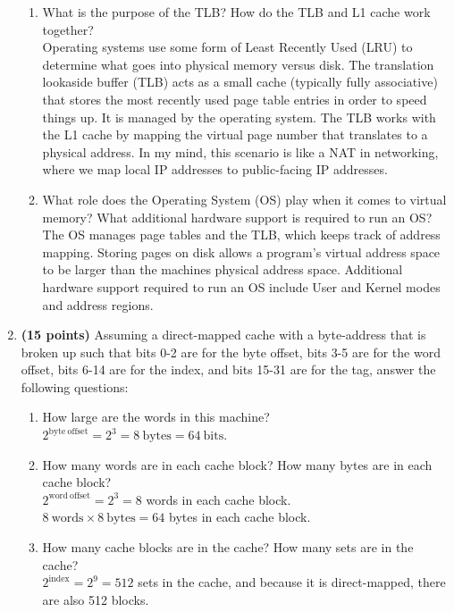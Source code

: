 \documentclass[11pt]{article}
\begin{document}
\begin{enumerate}
\begin{enumerate}
        \item What is the purpose of the TLB? How do the TLB and L1 cache work together?\\[1em]
        Operating systems use some form of Least Recently Used (LRU) to determine what goes into physical memory versus disk. The translation lookaside buffer (TLB) acts as a small cache (typically fully associative) that stores the most recently used page table entries in order to speed things up. It is managed by the operating system. The TLB works with the L1 cache by mapping the virtual page number that translates to a physical address. In my mind, this scenario is like a NAT in networking, where we map local IP addresses to public-facing IP addresses.\\

        \item What role does the Operating System (OS) play when it comes to virtual memory? What additional hardware support is required to run an OS?\\[1em]
        The OS manages page tables and the TLB, which keeps track of address mapping. Storing pages on disk allows a program’s virtual address space to be larger than the machines physical address space. Additional hardware support required to run an OS include User and Kernel modes and address regions.
    \end{enumerate}
\newpage
    \item \textbf{(15 points)} Assuming a direct-mapped cache with a byte-address that is broken up such that bits 0-2 are for the byte offset, bits 3-5 are for the word offset, bits 6-14 are for the index, and bits 15-31 are for the tag, answer the following questions:
    \begin{enumerate}
        \item How large are the words in this machine?\\[1em]
        $2^{\mathrm{byte\ offset}}=2^3=8\mathrm{\ bytes}=64\mathrm{\ bits.}$\\

        \item How many words are in each cache block? How many bytes are in each cache block?\\[1em]
        $2^{\mathrm{word\ offset}}=2^3=8$ words in each cache block.\\ $8\mathrm{\ words} \times 8\mathrm{\ bytes}=64$ bytes in each cache block.\\

        \item How many cache blocks are in the cache? How many sets are in the cache?\\[1em]
        $2^{\mathrm{index}}=2^9=512$ sets in the cache, and because it is direct-mapped, there are also 512 blocks.\\


\end{enumerate}
\end{enumerate}
\end{document}
